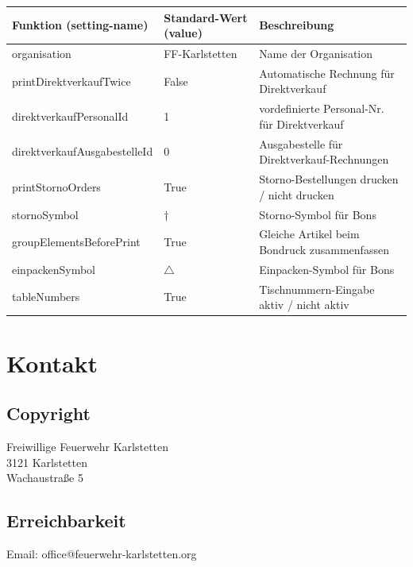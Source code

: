 \documentclass[
10pt, %
a4paper, %
oneside, %
headinclude,footinclude, %
BCOR5mm, %
]{scrartcl}
\theoremstyle{definition} %
\theoremstyle{plain} %
\theoremstyle{remark} %
\begin{document}
\begin{table}[h]
\footnotesize
\begin{tabular}{|l|l|l|}
\hline
Funktion (setting-name) & Standard-Wert (value) & Beschreibung \\
\hline
\hline
organisation & FF-Karlstetten & Name der Organisation \\
\hline
printDirektverkaufTwice & False & Automatische Rechnung für Direktverkauf \\
\hline
direktverkaufPersonalId & 1 & vordefinierte Personal-Nr. für Direktverkauf \\
\hline
direktverkaufAusgabestelleId & 0 & Ausgabestelle für Direktverkauf-Rechnungen \\
\hline
printStornoOrders & True & Storno-Bestellungen drucken / nicht drucken \\
\hline
stornoSymbol & † & Storno-Symbol für Bons \\
\hline
groupElementsBeforePrint & True & Gleiche Artikel beim Bondruck zusammenfassen \\
\hline
einpackenSymbol & $\triangle$ & Einpacken-Symbol für Bons \\
\hline
tableNumbers & True & Tischnummern-Eingabe aktiv / nicht aktiv \\
\hline
\end{tabular}
\end{table}



\newpage
\section{Kontakt}
\subsection{Copyright}
Freiwillige Feuerwehr Karlstetten\\
3121 Karlstetten\\
Wachaustraße 5

\subsection{Erreichbarkeit}
Email: office@feuerwehr-karlstetten.org




\end{document}
